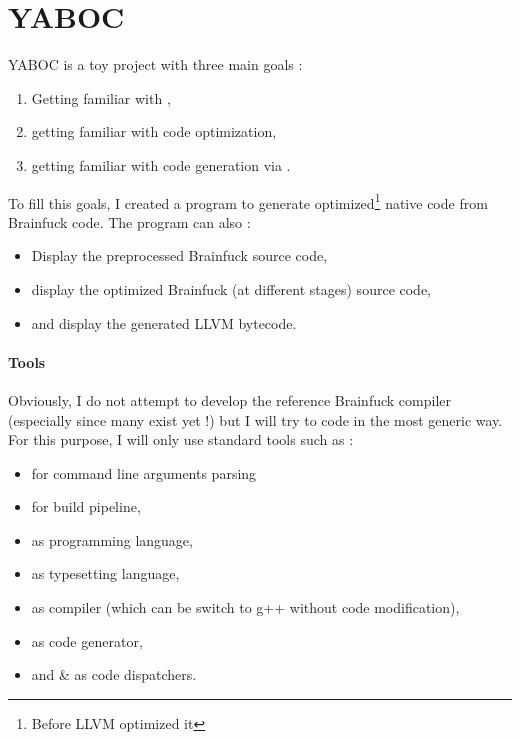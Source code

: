\section{YABOC}%
\gls{YABOC} is a toy project with three main goals :
\begin{enumerate}
        \item Getting familiar with ,
        \item getting familiar with code optimization,
        \item getting familiar with code generation via .
\end{enumerate}

To fill this goals, I created a program to generate optimized\footnote{Before LLVM optimized it} native code from Brainfuck code. The program can also :
\begin{itemize}
        \item Display the preprocessed Brainfuck source code,
        \item display the optimized Brainfuck (at different stages) source code,
        \item and display the generated LLVM bytecode.
\end{itemize}

\paragraph{Tools} 
Obviously, I do not attempt to develop the reference Brainfuck compiler (especially since many exist yet !) but I will try to code in the most generic way. For this purpose, I will only use standard tools such as :
\begin{itemize}
        \item {} for command line arguments parsing
        \item {} for build pipeline,
        \item {} as programming language,
        \item \tbf{\LaTeX} as typesetting language,
        \item {} as compiler (which can be switch to g++ without code modification),
        \item {} as code generator,
        \item and  \&  as code dispatchers.
\end{itemize}


